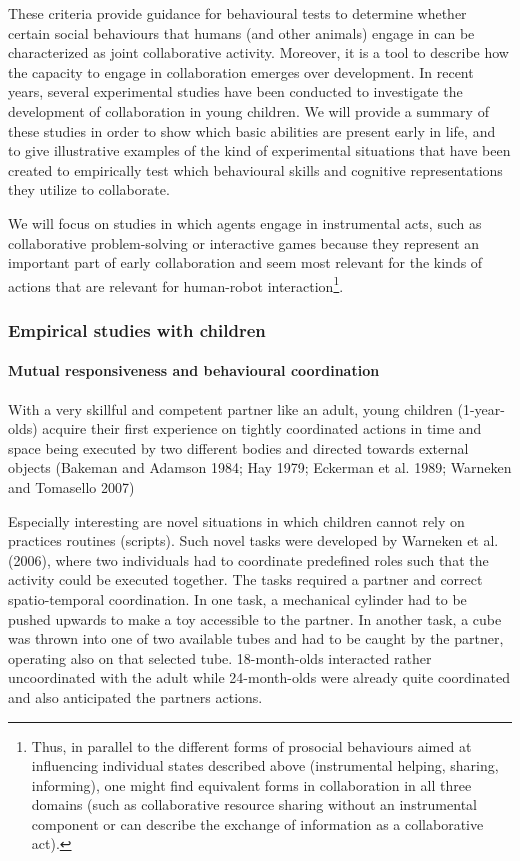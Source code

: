 \documentclass{article}
\begin{document}
These criteria provide guidance for behavioural tests to determine whether
certain social behaviours that humans (and other animals) engage in can be
characterized as joint collaborative activity. Moreover, it is a tool to
describe how the capacity to engage in collaboration emerges over development.
In recent years, several experimental studies have been conducted to
investigate the development of collaboration in young children. We will provide
a summary of these studies in order to show which basic abilities are present
early in life, and to give illustrative examples of the kind of experimental
situations that have been created to empirically test which behavioural skills
and cognitive representations they utilize to collaborate.

We will focus on
studies in which agents engage in instrumental acts, such as collaborative
problem-solving or interactive games because they represent an important part
of early collaboration and seem most relevant for the kinds of actions that are
relevant for human-robot interaction\footnote{Thus, in parallel to the
different forms of prosocial behaviours aimed at influencing individual states
described above (instrumental helping, sharing, informing), one might find
equivalent forms in collaboration in all three domains (such as collaborative
resource sharing without an instrumental component or can describe the exchange
of information as a collaborative act).}. 

\subsubsection{Empirical studies with children}


\paragraph{Mutual responsiveness and behavioural coordination}

With a very skillful and competent partner like an adult, young children
(1-year-olds) acquire their first experience on tightly coordinated actions in
time and space being executed by two different bodies and directed towards
external objects (Bakeman and Adamson 1984; Hay 1979; Eckerman et al. 1989;
Warneken and Tomasello 2007)

Especially interesting are novel situations in which children cannot rely
on practices routines (scripts). Such novel tasks were developed by Warneken et
al. (2006), where two individuals had to coordinate predefined roles such that
the activity could be executed together. The tasks required a partner and
correct spatio-temporal coordination. In one task, a mechanical cylinder had to
be pushed upwards to make a toy accessible to the partner. In another task, a
cube was thrown into one of two available tubes and had to be caught by the
partner, operating also on that selected tube. 18-month-olds interacted rather
uncoordinated with the adult while 24-month-olds were already quite coordinated
and also anticipated the partners actions.
\end{document}
